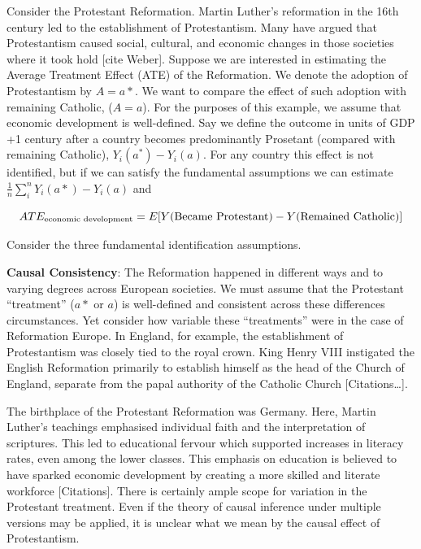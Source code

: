 \documentclass[
  singlecolumn]{report}
\begin{document}
Consider the Protestant Reformation. Martin Luther's reformation in the
16th century led to the establishment of Protestantism. Many have argued
that Protestantism caused social, cultural, and economic changes in
those societies where it took hold {[}cite Weber{]}. Suppose we are
interested in estimating the Average Treatment Effect (ATE) of the
Reformation. We denote the adoption of Protestantism by \(A = a*\). We
want to compare the effect of such adoption with remaining Catholic,
(\(A = a\)). For the purposes of this example, we assume that economic
development is well-defined. Say we define the outcome in units of GDP
+1 century after a country becomes predominantly Prosetant (compared
with remaining Catholic), \(Y_i(a^*) - Y_i(a)\). For any country this
effect is not identified, but if we can satisfy the fundamental
assumptions we can estimate \(\frac{1}{n} \sum_i^{n} Y_i(a*) - Y_i(a)\)
and

\[ATE_{\textnormal{economic~development}} = E[Y(\textnormal{Became~Protestant}) - Y(\textnormal{Remained~Catholic})]\]

Consider the three fundamental identification assumptions.

\textbf{Causal Consistency}: The Reformation happened in different ways
and to varying degrees across European societies. We must assume that
the Protestant ``treatment'' (\(a*\) or \(a\)) is well-defined and
consistent across these differences circumstances. Yet consider how
variable these ``treatments'' were in the case of Reformation Europe. In
England, for example, the establishment of Protestantism was closely
tied to the royal crown. King Henry VIII instigated the English
Reformation primarily to establish himself as the head of the Church of
England, separate from the papal authority of the Catholic Church
{[}Citations\ldots{]}.

The birthplace of the Protestant Reformation was Germany. Here, Martin
Luther's teachings emphasised individual faith and the interpretation of
scriptures. This led to educational fervour which supported increases in
literacy rates, even among the lower classes. This emphasis on education
is believed to have sparked economic development by creating a more
skilled and literate workforce {[}Citations{]}. There is certainly ample
scope for variation in the Protestant treatment. Even if the theory of
causal inference under multiple versions may be applied, it is unclear
what we mean by the causal effect of Protestantism.
\end{document}
